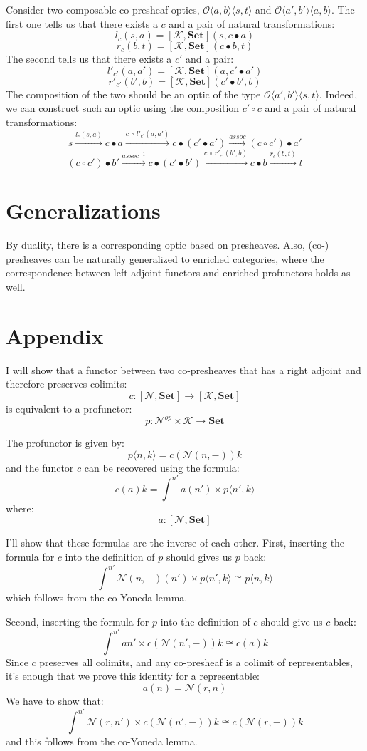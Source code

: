 \documentclass[11pt]{amsart}
\newcommand{\cat}[1]{\mathcal{#1}}%
\newcommand{\Cat}[1]{\mathbf{#1}}%
\newcommand{\Set}{\Cat{Set}}
\begin{document}
Consider two composable co-presheaf optics, $\mathcal{O}\langle a, b\rangle \langle s, t \rangle$ and $\mathcal{O}\langle a', b' \rangle \langle a, b \rangle$. The first one tells us that there exists a $c$ and a pair of natural transformations:
\[ l_c (s,  a ) = [\cat K, \Set] \left(s,  c \bullet a \right) \] 
\[ r_c (b, t) = [\cat K, \Set] \left(c \bullet b, t \right) \]
The second tells us that there exists a $c'$ and a pair:
\[ l'_{c'} (a,  a' ) = [\cat K, \Set] \left(a,  c' \bullet a' \right) \] 
\[ r'_{c'} (b', b) = [\cat K, \Set] \left(c' \bullet b', b \right) \]
The composition of the two should be an optic of the type $\mathcal{O}\langle a', b'\rangle \langle s, t \rangle$. Indeed, we can construct such an optic using the composition $c' \circ c$ and a pair of natural transformations:
\[s \xrightarrow{l_c (s,  a )} c \bullet a \xrightarrow{c \,\circ \, l'_{c'} (a,  a')} c \bullet (c' \bullet a')
  \xrightarrow{assoc} (c \circ c') \bullet a'\]
\[ (c \circ c') \bullet b' \xrightarrow{assoc^{-1}} c \bullet (c' \bullet b') \xrightarrow{c \, \circ \, r'_{c'} (b', b)} c \bullet b
 \xrightarrow{r_c (b, t)}  t \]
 
\section{Generalizations}

By duality, there is a corresponding optic based on presheaves. Also, (co-) presheaves can be naturally generalized to enriched categories, where the correspondence between left adjoint functors and enriched profunctors holds as well. 

\section{Appendix}

I will show that a functor between two co-presheaves that has a right adjoint and therefore preserves colimits:
\[ c \colon [\cat N, \Set] \to [\cat K, \Set] \]
is equivalent to a profunctor:
\[p \colon \cat N^{op} \times \cat K \to \Set \]

The profunctor is given by:
\[p \langle n, k \rangle = c ( \cat N(n, -)) k \]
and the functor $c$ can be recovered using the formula:
\[ c (a) k = \int^{n'} a (n') \times p \langle n', k \rangle \]
where:
\[ a \colon [\cat N, \Set] \]

I'll show that these formulas are the inverse of each other. First, inserting the formula for $c$ into the definition of $p$ should gives us $p$ back:
\[  \int^{n'} \cat N(n, -) (n') \times p\langle n', k \rangle \cong  p \langle n, k \rangle \]
which follows from the co-Yoneda lemma.

Second, inserting the formula for $p$ into the definition of $c$ should give us $c$ back:
\[  \int^{n'} a n' \times c(\cat N(n', -)) k  \cong c (a) k  \]
Since $c$ preserves all colimits, and any co-presheaf is a colimit of representables, it's enough that we prove this identity for a representable:
\[ a (n) = \cat N (r, n) \]
We have to show that:
\[ \int^{n'}  \cat N (r, n')  \times  c(\cat N(n', -)) k \cong  c ( \cat N (r, -) ) k\]
and this follows from the co-Yoneda lemma.
\end{document}
